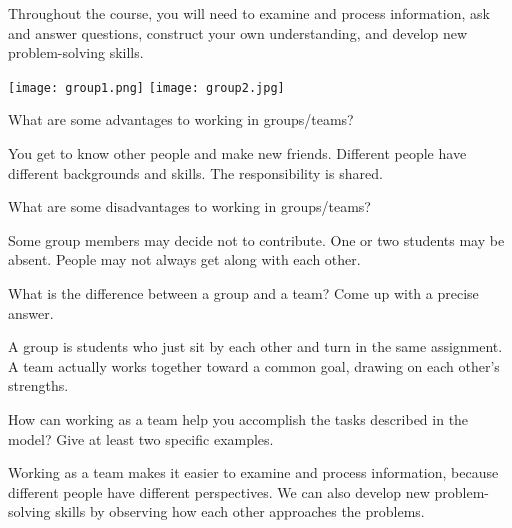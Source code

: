 

Throughout the course, you will need to examine and process information, ask and answer questions, construct your own understanding, and develop new problem-solving skills.

\begin{center}
\texttt{[image: group1.png]}
\hspace{0.5in}
\texttt{[image: group2.jpg]}
\end{center}




\Q What are some advantages to working in groups/teams?

\begin{answer}[5em]
You get to know other people and make new friends.
Different people have different backgrounds and skills.
The responsibility is shared.
\end{answer}


\Q What are some disadvantages to working in groups/teams?

\begin{answer}[5em]
Some group members may decide not to contribute.
One or two students may be absent.
People may not always get along with each other.
\end{answer}


\Q What is the difference between a group and a team?
Come up with a precise answer.

\begin{answer}[5em]
A group is students who just sit by each other and turn in the same assignment.
A team actually works together toward a common goal, drawing on each other's strengths.
\end{answer}


\Q How can working as a team help you accomplish the tasks described in the model?
Give at least two specific examples.

\begin{answer}[5em]
Working as a team makes it easier to examine and process information, because different people have different perspectives.
We can also develop new problem-solving skills by observing how each other approaches the problems.
\end{answer}
